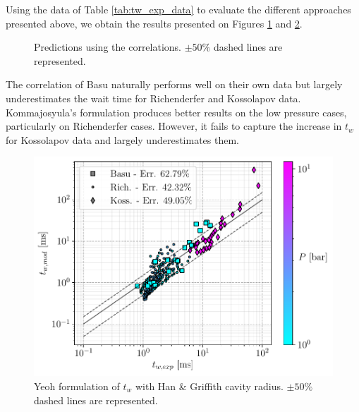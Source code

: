 Using the data of Table \ref{tab:tw_exp_data} to evaluate the different approaches presented above, we obtain the results presented on Figures \ref{fig:tw_pred_correl} and \ref{fig:tw_pred_anal}.


\begin{figure}[!h]
\centering
{}
\caption{Predictions using the correlations. $\pm 50\%$ dashed lines are represented.}
\label{fig:tw_pred_correl}
\end{figure}

\npar
The correlation of Basu \etal naturally performs well on their own data but largely underestimates the wait time for Richenderfer and Kossolapov data. Kommajosyula's formulation produces better results on the low pressure cases, particularly on Richenderfer cases. However, it fails to capture the increase in $t_{w}$ for Kossolapov data and largely underestimates them.


\begin{figure}[!h]
\centering
\includegraphics[width=0.5\linewidth]{img/tw/twYeoh_RcHan.pdf}
\caption{Yeoh \etal formulation of $t_{w}$ with Han \& Griffith cavity radius. $\pm 50\%$ dashed lines are represented.}
\label{fig:tw_pred_anal}
\end{figure}

